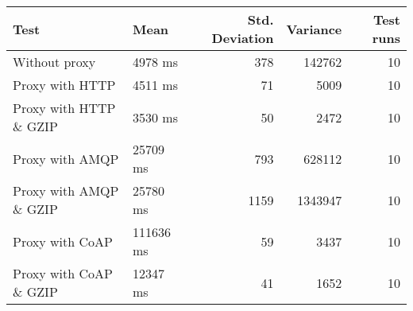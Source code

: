 \begin{tabular}{llrrr}
\hline
 Test                   & Mean      &   Std. Deviation &   Variance &   Test runs \\
\hline
 Without proxy          & 4978 ms   &              378 &     142762 &          10 \\
 Proxy with HTTP        & 4511 ms   &               71 &       5009 &          10 \\
 Proxy with HTTP \& GZIP & 3530 ms   &               50 &       2472 &          10 \\
 Proxy with AMQP        & 25709 ms  &              793 &     628112 &          10 \\
 Proxy with AMQP \& GZIP & 25780 ms  &             1159 &    1343947 &          10 \\
 Proxy with CoAP        & 111636 ms &               59 &       3437 &          10 \\
 Proxy with CoAP \& GZIP & 12347 ms  &               41 &       1652 &          10 \\
\hline
\end{tabular}